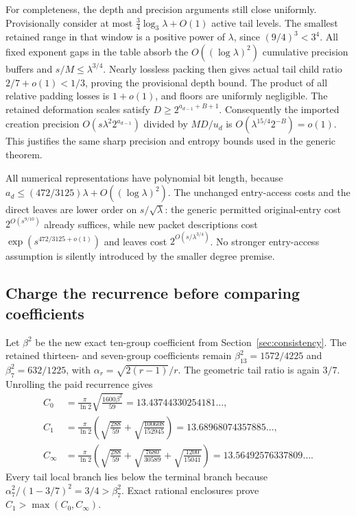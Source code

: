 For completeness, the depth and precision arguments still close uniformly.
Provisionally consider at most $\frac34\log_3\lambda+O(1)$ active tail
levels. The smallest retained range in that window is a positive power of
$\lambda$, since $(9/4)^3<3^4$. All fixed exponent gaps in the table absorb
the $O((\log\lambda)^2)$ cumulative precision buffers and
$s/M\le\lambda^{3/4}$. Nearly lossless packing then gives actual tail child
ratio $2/7+o(1)<1/3$, proving the provisional depth bound.
The product of all relative padding losses is $1+o(1)$, and floors are
uniformly negligible. The retained deformation scales satisfy
$D\ge2^{a_{d-1}+B+1}$. Consequently the imported creation precision
$O(s\lambda^2 2^{a_{d-1}})$ divided by $MD/u_d$ is
$O(\lambda^{15/4}2^{-B})=o(1)$. This justifies the same sharp precision
and entropy bounds used in the generic theorem.

All numerical representations have polynomial bit length, because
$a_d\le(472/3125)\lambda+O((\log\lambda)^2)$.
The unchanged entry-access costs and the direct leaves are lower order on
$s/\sqrt\lambda$: the generic permitted original-entry cost
$2^{O(s^{9/10})}$ already suffices, while new packet descriptions cost
$\exp(s^{472/3125+o(1)})$ and leaves cost
$2^{O(s/\lambda^{3/4})}$. No stronger entry-access assumption is silently
introduced by the smaller degree premise.

\subsection{Charge the recurrence before comparing coefficients}

Let $\beta^2$ be the new exact ten-group coefficient from
Section~\ref{sec:consistency}. The retained thirteen- and seven-group
coefficients remain $\beta_{13}^2=1572/4225$ and
$\beta_7^2=632/1225$, with
$\alpha_r=\sqrt{2(r-1)}/r$. The geometric tail ratio is again $3/7$.
Unrolling the paid recurrence gives
\begin{align*}
 C_0&=\frac\pi{\ln2}\sqrt{\frac{1600\beta^2}{59}}
      =13.43744330254181\ldots,\\
 C_1&=\frac\pi{\ln2}
      \left(\sqrt{\frac{288}{59}}+
            \sqrt{\frac{100608}{152945}}\right)
      =13.68968074357885\ldots,\\
 C_\infty&=\frac\pi{\ln2}
      \left(\sqrt{\frac{288}{59}}+
            \sqrt{\frac{7680}{30589}}+
            \sqrt{\frac{1200}{15041}}\right)
      =13.56492576337809\ldots.
\end{align*}
Every tail local branch lies below the terminal branch because
$\alpha_7^2/(1-3/7)^2=3/4>\beta_7^2$. Exact rational enclosures prove
$C_1>\max(C_0,C_\infty)$.

